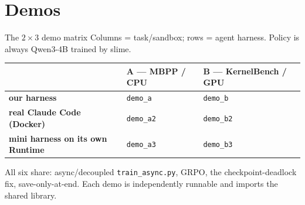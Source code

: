 \documentclass[aspectratio=169]{beamer}
\begin{document}
\section{Demos}

\begin{frame}{The $2\times3$ demo matrix}
  Columns = task/sandbox; rows = agent harness. Policy is always Qwen3-4B trained by slime.
  \vspace{0.3em}
  \begin{table}\centering
    \renewcommand{\arraystretch}{1.3}\small
    \begin{tabular}{lll}
      \toprule
       & \textbf{A --- MBPP / CPU} & \textbf{B --- KernelBench / GPU} \\
      \midrule
      \textbf{our harness}          & \texttt{demo\_a}  & \texttt{demo\_b} \\
      \textbf{real Claude Code (Docker)} & \texttt{demo\_a2} & \texttt{demo\_b2} \\
      \textbf{mini harness on its own Runtime} & \texttt{demo\_a3} & \texttt{demo\_b3} \\
      \bottomrule
    \end{tabular}
  \end{table}
  \vspace{0.2em}
  \footnotesize All six share: async/decoupled \texttt{train\_async.py}, GRPO, the
  checkpoint-deadlock fix, save-only-at-end. Each demo is independently runnable and imports the
  shared library.
\end{frame}
\end{document}
